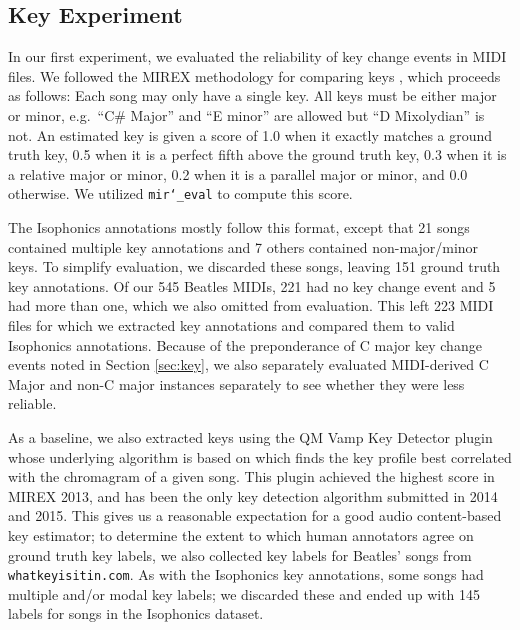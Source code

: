 \documentclass{article}
\begin{document}
\subsection{Key Experiment}

In our first experiment, we evaluated the reliability of key change events in MIDI files.
We followed the MIREX methodology for comparing keys \cite{ehmann2016mirex}, which proceeds as follows:
Each song may only have a single key.
All keys must be either major or minor, e.g.\ ``C\# Major'' and ``E minor'' are allowed but ``D Mixolydian'' is not.
An estimated key is given a score of 1.0 when it exactly matches a ground truth key, 0.5 when it is a perfect fifth above the ground truth key, 0.3 when it is a relative major or minor, 0.2 when it is a parallel major or minor, and 0.0 otherwise.
We utilized \texttt{mir\char`_eval} \cite{raffel2014mir_eval} to compute this score.

The Isophonics annotations mostly follow this format, except that 21 songs contained multiple key annotations and 7 others contained non-major/minor keys.
To simplify evaluation, we discarded these songs, leaving 151 ground truth key annotations.
Of our 545 Beatles MIDIs, 221 had no key change event and 5 had more than one, which we also omitted from evaluation.
This left 223 MIDI files for which we extracted key annotations and compared them to valid Isophonics annotations.
Because of the preponderance of C major key change events noted in Section \ref{sec:key}, we also separately evaluated MIDI-derived C Major and non-C major instances separately to see whether they were less reliable.

As a baseline, we also extracted keys using the QM Vamp Key Detector plugin \cite{cannam2015mirex} whose underlying algorithm is based on \cite{noland2007signal} which finds the key profile best correlated with the chromagram of a given song.
This plugin achieved the highest score in MIREX 2013, and has been the only key detection algorithm submitted in 2014 and 2015.
This gives us a reasonable expectation for a good audio content-based key estimator; to determine the extent to which human annotators agree on ground truth key labels, we also collected key labels for Beatles' songs from \texttt{whatkeyisitin.com}.
As with the Isophonics key annotations, some songs had multiple and/or modal key labels; we discarded these and ended up with 145 labels for songs in the Isophonics dataset.
\end{document}
